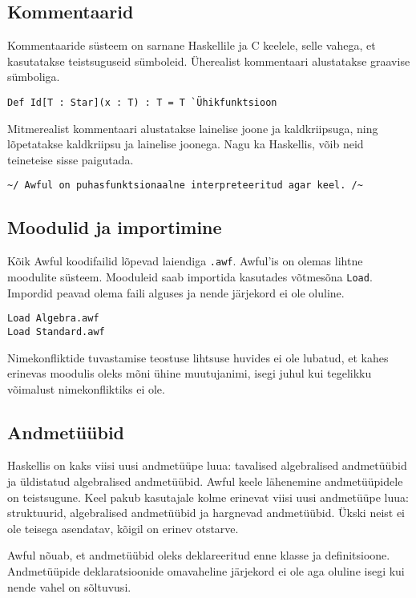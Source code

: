 \documentclass[12pt]{article}
\begin{document}
    \subsection{Kommentaarid}
      Kommentaaride süsteem on sarnane Haskellile ja C keelele, selle vahega, et kasutatakse teistsuguseid sümboleid. Üherealist kommentaari alustatakse graavise sümboliga.

      \begin{verbatim}Def Id[T : Star](x : T) : T = T `Ühikfunktsioon\end{verbatim}

      Mitmerealist kommentaari alustatakse lainelise joone ja kaldkriipsuga, ning lõpetatakse kaldkriipsu ja lainelise joonega. Nagu ka Haskellis, võib neid teineteise sisse paigutada.

      \begin{verbatim}~/ Awful on puhasfunktsionaalne interpreteeritud agar keel. /~\end{verbatim}

    \subsection{Moodulid ja importimine}
      Kõik Awful koodifailid lõpevad laiendiga \verb!.awf!. Awful'is on olemas lihtne moodulite süsteem. Mooduleid saab importida kasutades võtmesõna \verb!Load!. Impordid peavad olema faili alguses ja nende järjekord ei ole oluline.

      \begin{verbatim}Load Algebra.awf
Load Standard.awf\end{verbatim}

      Nimekonfliktide tuvastamise teostuse lihtsuse huvides ei ole lubatud, et kahes erinevas moodulis oleks mõni ühine muutujanimi, isegi juhul kui tegelikku võimalust nimekonfliktiks ei ole.
    \subsection{Andmetüübid}
      Haskellis on kaks viisi uusi andmetüüpe luua: tavalised algebralised andmetüübid ja üldistatud algebralised andmetüübid. Awful keele lähenemine andmetüüpidele on teistsugune. Keel pakub kasutajale kolme erinevat viisi uusi andmetüüpe luua: struktuurid, algebralised andmetüübid ja hargnevad andmetüübid. Ükski neist ei ole teisega asendatav, kõigil on erinev otstarve.

      Awful nõuab, et andmetüübid oleks deklareeritud enne klasse ja definitsioone. Andmetüüpide deklaratsioonide omavaheline järjekord ei ole aga oluline isegi kui nende vahel on sõltuvusi.
\end{document}
